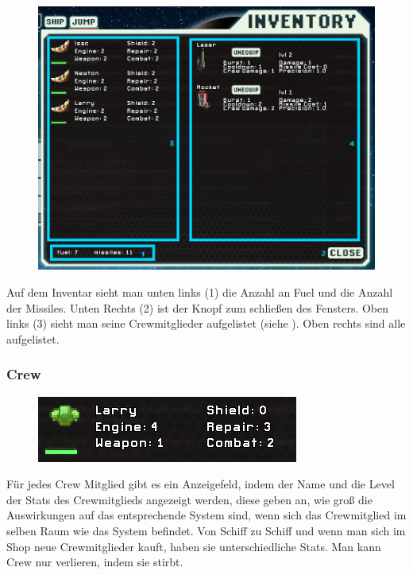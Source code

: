 \documentclass[fontsize=12pt,paper=a4,twoside]{scrartcl}
\begin{document}
\begin{figure}[H]
\centering
\includegraphics[width=0.8\linewidth]{DasSpiel/Inventar/inventar.png}
\end{figure} 

Auf dem Inventar sieht man unten links (1) die Anzahl an Fuel und die Anzahl der Missiles. Unten Rechts (2) ist der Knopf zum schließen des Fensters. Oben links (3) sieht man seine Crewmitglieder aufgelistet (siehe ). Oben rechts sind alle  aufgelistet. 

\subsubsection{Crew}\label{sec:Crew}

\begin{figure}[H]
\centering
\includegraphics[width=0.8\linewidth]{DasSpiel/Inventar/crew.png}
\end{figure} 

Für jedes Crew Mitglied gibt es ein Anzeigefeld, indem der Name und die Level der Stats des Crewmitglieds angezeigt werden, diese geben an, wie groß die Auswirkungen auf das entsprechende System sind, wenn sich das Crewmitglied im selben Raum wie das System befindet. Von Schiff zu Schiff und wenn man sich im Shop neue Crewmitglieder kauft, haben sie unterschiedliche Stats. Man kann Crew nur verlieren, indem sie stirbt. 
\end{document}

